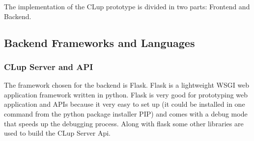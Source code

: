 The implementation of the CLup prototype is divided in two parts: Frontend and Backend. 

\subsection{Backend Frameworks and Languages}

\subsubsection{CLup Server and API}
The framework chosen for the backend is Flask. Flask is a lightweight WSGI web application framework written in python. Flask is very good for prototyping web application and APIs because it very easy to set up (it could be installed in one command from the python package installer PIP) and comes with a debug mode that speeds up the debugging process.
Along with flask some other libraries are used to build the CLup Server Api.

